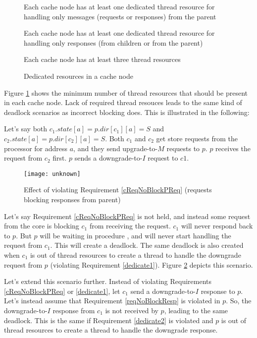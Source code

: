 \begin{figure}\small
\begin{requirement}
Each cache node has at least one dedicated thread resource for handling only messages
(requests or responses) from the parent\label{dedicate1}
\end{requirement}
\begin{requirement}
Each cache node has at least one dedicated thread resource for handling only responses
(from children or from the parent)\label{dedicate2}
\end{requirement}
\begin{requirement}
Each cache node has at least three thread resources\label{dedicate3}
\end{requirement}
\caption{Dedicated resources in a cache node}
\label{dedicated}
\end{figure}

Figure \ref{dedicated} shows the minimum number of thread resources that should
be present in each cache node. Lack of required thread resouces leads to the same
kind of deadlock scenarios as incorrect blocking does. This is illustrated in the
following:

Let's say both $c_1.state[a] = p.dir[c_1][a] = S$ and $c_2.state[a] =
p.dir[c_2][a] = S$. Both $c_1$ and $c_2$ get store requests from the processor
for address $a$, and they send upgrade-to-$M$ requests to $p$.  $p$ receives the
request from $c_2$ first. $p$ sends a downgrade-to-$I$ request to $c1$.

\begin{figure}
\centering
\texttt{[image: unknown]}
\caption{Effect of violating Requirement \ref{cReqNoBlockPReq} (requests blocking responses from parent)}
\label{unknown}
\end{figure}

Let's say Requirement \ref{cReqNoBlockPReq} is not held, and instead some request
from the core is blocking $c_1$ from receiving the request. $c_1$ will never
respond back to $p$. But $p$ will be waiting in procedure \dReqL{}, and will
never start handling the request from $c_1$. This will create a deadlock.  The
same deadlock is also created when $c_1$ is out of thread resources to create a
thread to handle the downgrade request from $p$ (violating Requirement
\ref{dedicate1}). Figure \ref{unknown} depicts this scenario.

Let's extend this scenario further. Instead of violating Requirements
\ref{cReqNoBlockPReq} or \ref{dedicate1}, let $c_1$
send a downgrade-to-$I$ response to $p$. Let's instead assume that Requirement
\ref{reqNoBlockResp} is violated in $p$. So, the downgrade-to-$I$ response from
$c_1$ is not received by $p$, leading to the same deadlock. This is the same if
Requirement \ref{dedicate2} is violated and $p$ is out of thread resources to
create a thread to handle the downgrade response.

